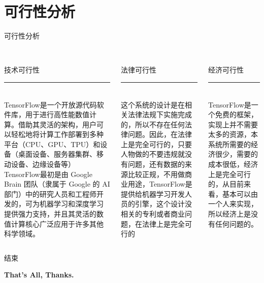 \documentclass{ctexbeamer}
\begin{document}
    \section{可行性分析}
    \begin{frame}{可行性分析}
        \begin{columns}
            \begin{column}{.3\textwidth}
                \normalsize \\技术可行性\\
                \rule[5pt]{2.5cm}{0.005em}\\
                \scriptsize TensorFlow是一个开放源代码软件库，用于进行高性能数值计算。借助其灵活的架构，用户可以轻松地将计算工作部署到多种平台（CPU、GPU、TPU）和设备（桌面设备、服务器集群、移动设备、边缘设备等）TensorFlow最初是由 Google Brain 团队（隶属于 Google 的 AI 部门）中的研究人员和工程师开发的，可为机器学习和深度学习提供强力支持，并且其灵活的数值计算核心广泛应用于许多其他科学领域。 \\
            \end{column}
            \begin{column}{.3\textwidth}
                \normalsize \\法律可行性\\
                \rule[5pt]{2.5cm}{0.005em}\\
                \scriptsize 这个系统的设计是在相关法律法规下实施完成的，所以不存在任何法律问题。因此，在法律上是完全可行的，只要人物做的不要违规就没有问题，还有数据的来源比较正规，不用做商业用途，TensorFlow是提供给机器学习开发人员的引擎，这个设计没相关的专利或者商业问题，在法律上是完全可行的
            \end{column}
            \begin{column}{.3\textwidth}
                \normalsize \\经济可行性\\
                \rule[5pt]{2.5cm}{0.005em}\\
                \scriptsize TensorFlow是一个免费的框架，实现上并不需要太多的资源，本系统所需要的经济很少，需要的成本很低，经济上是完全可行的，从目前来看，基本可以由一个人来实现，所以经济上是没有任何问题的。
            \end{column}
        \end{columns}
    \end{frame}
    \begin{frame}{结束}
        \begin{center}
            \textbf{\Huge That's All, Thanks.}
        \end{center}
    \end{frame}
\end{document}
